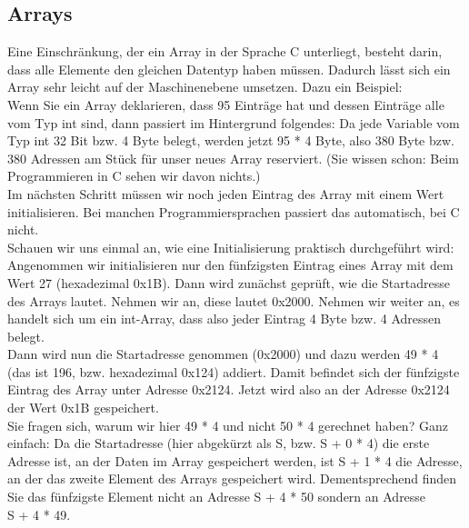 \subsection{Arrays}

Eine Einschränkung, der ein Array in der Sprache C unterliegt, besteht darin, dass alle Elemente den gleichen Datentyp haben müssen. Dadurch lässt sich ein Array sehr leicht auf der Maschinenebene umsetzen. Dazu ein Beispiel:\\

Wenn Sie ein Array deklarieren, dass 95 Einträge hat und dessen Einträge alle vom Typ int sind, dann passiert im Hintergrund folgendes: Da jede Variable vom Typ int 32 Bit bzw. 4 Byte belegt, werden jetzt 95 * 4 Byte, also 380 Byte bzw. 380 Adressen am Stück für unser neues Array reserviert. (Sie wissen schon: Beim Programmieren in C sehen wir davon nichts.)\\

Im nächsten Schritt müssen wir noch jeden Eintrag des Array mit einem Wert initialisieren. Bei manchen Programmiersprachen passiert das automatisch, bei C nicht.\\

Schauen wir uns einmal an, wie eine Initialisierung praktisch durchgeführt wird: Angenommen wir initialisieren nur den fünfzigsten Eintrag eines Array mit dem Wert 27 (hexadezimal 0x1B). Dann wird zunächst geprüft, wie die Startadresse des Arrays lautet. Nehmen wir an, diese lautet 0x2000. Nehmen wir weiter an, es handelt sich um ein int-Array, dass also jeder Eintrag 4 Byte bzw. 4 Adressen belegt.\\

Dann wird nun die Startadresse genommen (0x2000) und dazu werden 49 * 4 (das ist 196, bzw. hexadezimal 0x124) addiert. Damit befindet sich der fünfzigste Eintrag des Array unter Adresse 0x2124. Jetzt wird also an der Adresse 0x2124 der Wert 0x1B gespeichert.\\

Sie fragen sich, warum wir hier 49 * 4 und nicht 50 * 4 gerechnet haben? Ganz einfach: Da die Startadresse (hier abgekürzt als S, bzw. S + 0 * 4) die erste Adresse ist, an der Daten im Array gespeichert werden, ist S + 1 * 4 die Adresse, an der das zweite Element des Arrays gespeichert wird. Dementsprechend finden Sie das fünfzigste Element nicht an Adresse S + 4 * 50 sondern an Adresse \\

S + 4 * 49.\\


